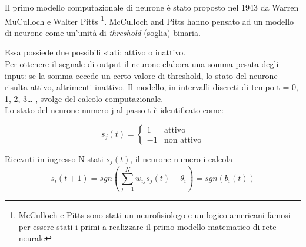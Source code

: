  Il primo modello computazionale di neurone è stato proposto nel 1943 da Warren MuCulloch
  e Walter Pitts \footnote{McCulloch e Pitts sono stati un neurofisiologo e un logico americani famosi per essere stati i primi a realizzare il primo modello matematico di rete neurale}. 
McCulloch and Pitts hanno pensato ad un modello di neurone come un’unità di \emph{threshold} (soglia) binaria.

Essa possiede due possibili stati: attivo o inattivo.\\
  Per ottenere il segnale di output il neurone elabora una 
 somma pesata degli input: se la somma eccede un certo valore di threshold, lo stato del neurone
  risulta attivo, altrimenti inattivo.
Il modello, in intervalli discreti di tempo t = 0, 1, 2, 3… , svolge del calcolo computazionale. \\
Lo stato del neurone numero j al passo t è identificato come:

\[s_j(t) = \left\{\begin{matrix}
    1 & \text{attivo}\\ 
    -1 & \text{non attivo}
    \end{matrix}\right.\]


Ricevuti in ingresso N stati \(s_j(t)\), il neurone numero i calcola 
\begin{equation} \label{1}
s_i(t+1)= sgn(\sum_{j=1}^{N}w_{ij}s_j(t)-\theta_i)= sgn(b_i(t))
\end{equation}

